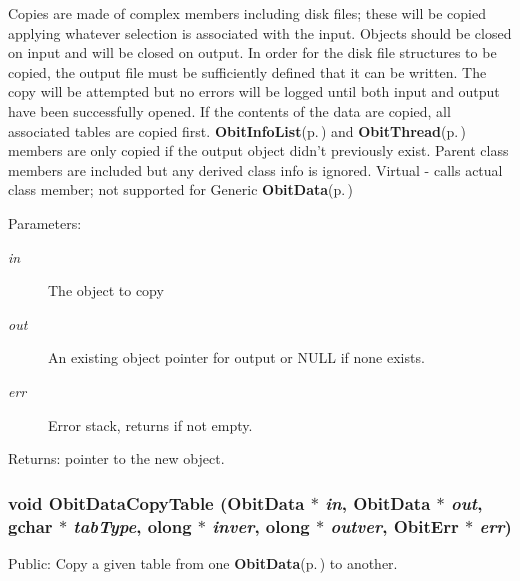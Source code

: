 Copies are made of complex members including disk files; these will be copied applying whatever selection is associated with the input. Objects should be closed on input and will be closed on output. In order for the disk file structures to be copied, the output file must be sufficiently defined that it can be written. The copy will be attempted but no errors will be logged until both input and output have been successfully opened. If the contents of the data are copied, all associated tables are copied first. {\bf Obit\-Info\-List}{\rm (p.\,\pageref{structObitInfoList})} and {\bf Obit\-Thread}{\rm (p.\,\pageref{structObitThread})} members are only copied if the output object didn't previously exist. Parent class members are included but any derived class info is ignored. Virtual - calls actual class member; not supported for Generic {\bf Obit\-Data}{\rm (p.\,\pageref{structObitData})} \begin{Desc}
\item[Parameters:]
\begin{description}
\item[{\em in}]The object to copy \item[{\em out}]An existing object pointer for output or NULL if none exists. \item[{\em err}]Error stack, returns if not empty. \end{description}
\end{Desc}
\begin{Desc}
\item[Returns:]pointer to the new object. \end{Desc}
\subsubsection{\setlength{\rightskip}{0pt plus 5cm}void Obit\-Data\-Copy\-Table ({\bf Obit\-Data} $\ast$ {\em in}, {\bf Obit\-Data} $\ast$ {\em out}, gchar $\ast$ {\em tab\-Type}, {\bf olong} $\ast$ {\em inver}, {\bf olong} $\ast$ {\em outver}, {\bf Obit\-Err} $\ast$ {\em err})}\label{ObitData_8c_a24}


Public: Copy a given table from one {\bf Obit\-Data}{\rm (p.\,\pageref{structObitData})} to another. 

